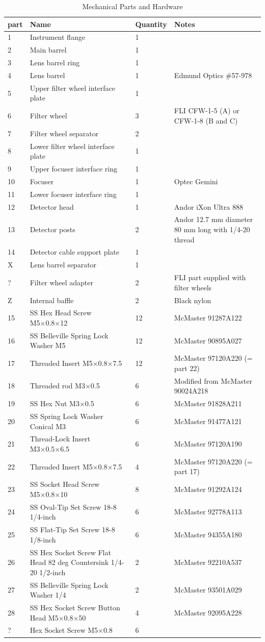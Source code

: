 \begin{table}
\caption{Mechanical Parts and Hardware}
\medskip
\footnotesize
\begin{center}
\begin{tabular}{llll}
\hline
part&Name&Quantity&Notes\\
\hline
1&Instrument flange&1\\
2&Main barrel&1\\
3&Lens barrel ring&1\\
4&Lens barrel&1&Edmund Optics \#57-978\\
5&Upper filter wheel interface plate&1\\
6&Filter wheel&3&FLI CFW-1-5 (A) or CFW-1-8 (B and C)\\
7&Filter wheel separator&2\\
8&Lower filter wheel interface plate&1\\
9&Upper focuser interface ring&1\\
10&Focuser&1&Optec Gemini\\
11&Lower focuser interface ring&1\\
12&Detector head&1&Andor iXon Ultra 888\\
13&Detector posts&2&Andor 12.7 mm diameter 80 mm long with 1/4-20 thread\\
14&Detector cable support plate&1\\
X&Lens barrel separator&1\\
?&Filter wheel adapter&2&FLI part supplied with filter wheels\\
Z&Internal baffle&2&Black nylon\\
\hline
15&SS Hex Head Screw M5×0.8×12&12&McMaster 91287A122\\
16&SS Belleville Spring Lock Washer M5&12&McMaster 90895A027\\
17&Threaded Insert M5×0.8×7.5&12&McMaster 97120A220 (= part 22)\\
18&Threaded rod M3×0.5&6&Modified from McMaster 90024A218\\
19&SS Hex Nut M3×0.5&6&McMaster 91828A211\\
20&SS Spring Lock Washer Conical M3&6&McMaster 91477A121\\
21&Thread-Lock Insert M3×0.5×6.5&6&McMaster 97120A190\\
22&Threaded Insert M5×0.8×7.5&4&McMaster 97120A220 (= part 17)\\
23&SS Socket Head Screw M5×0.8×10&8&McMaster 91292A124\\
24&SS Oval-Tip Set Screw 18-8 1/4-inch&6&McMaster 92778A113\\
25&SS Flat-Tip Set Screw 18-8 1/8-inch&6&McMaster 94355A180\\
26&SS Hex Socket Screw Flat Head 82 deg Countersink 1/4-20 1/2-inch&2&McMaster 92210A537\\
27&SS Belleville Spring Lock Washer 1/4&2&McMaster 93501A029\\
28&SS Hex Socket Screw Button Head M5×0.8×50&4&McMaster 92095A228\\
?&Hex Socket Screw M5×0.8&6&\\
\hline
\end{tabular}
\end{center}
\end{table}

